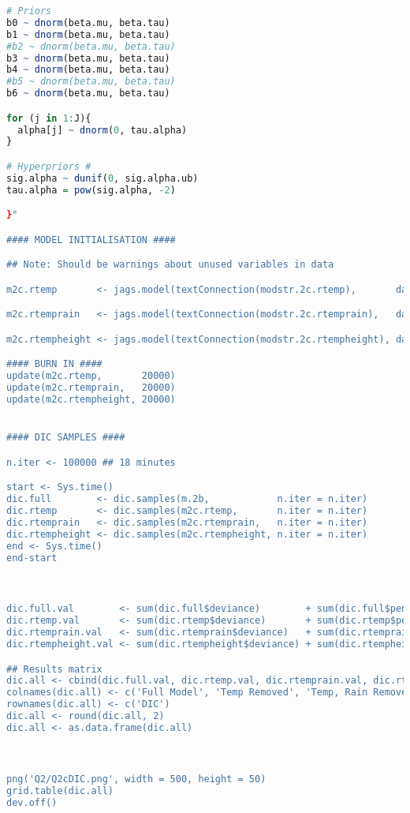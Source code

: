 \documentclass[11pt]{article}
\begin{document}
\begin{lstlisting}[language=R]
# Priors
b0 ~ dnorm(beta.mu, beta.tau)
b1 ~ dnorm(beta.mu, beta.tau)
#b2 ~ dnorm(beta.mu, beta.tau)
b3 ~ dnorm(beta.mu, beta.tau)
b4 ~ dnorm(beta.mu, beta.tau)
#b5 ~ dnorm(beta.mu, beta.tau)
b6 ~ dnorm(beta.mu, beta.tau)

for (j in 1:J){
  alpha[j] ~ dnorm(0, tau.alpha)
}

# Hyperpriors #
sig.alpha ~ dunif(0, sig.alpha.ub)
tau.alpha = pow(sig.alpha, -2)

}"

#### MODEL INITIALISATION ####

## Note: Should be warnings about unused variables in data

m2c.rtemp       <- jags.model(textConnection(modstr.2c.rtemp),       data = data, n.chains = 2)

m2c.rtemprain   <- jags.model(textConnection(modstr.2c.rtemprain),   data = data, n.chains = 2)

m2c.rtempheight <- jags.model(textConnection(modstr.2c.rtempheight), data = data, n.chains = 2)

#### BURN IN ####
update(m2c.rtemp,       20000)
update(m2c.rtemprain,   20000)
update(m2c.rtempheight, 20000)


#### DIC SAMPLES ####

n.iter <- 100000 ## 18 minutes

start <- Sys.time()
dic.full        <- dic.samples(m.2b,            n.iter = n.iter)
dic.rtemp       <- dic.samples(m2c.rtemp,       n.iter = n.iter)
dic.rtemprain   <- dic.samples(m2c.rtemprain,   n.iter = n.iter)
dic.rtempheight <- dic.samples(m2c.rtempheight, n.iter = n.iter)
end <- Sys.time()
end-start



dic.full.val        <- sum(dic.full$deviance)        + sum(dic.full$penalty)
dic.rtemp.val       <- sum(dic.rtemp$deviance)       + sum(dic.rtemp$penalty)
dic.rtemprain.val   <- sum(dic.rtemprain$deviance)   + sum(dic.rtemprain$penalty)
dic.rtempheight.val <- sum(dic.rtempheight$deviance) + sum(dic.rtempheight$penalty)

## Results matrix
dic.all <- cbind(dic.full.val, dic.rtemp.val, dic.rtemprain.val, dic.rtempheight.val)
colnames(dic.all) <- c('Full Model', 'Temp Removed', 'Temp, Rain Removed', 'Temp, Height Removed')
rownames(dic.all) <- c('DIC')
dic.all <- round(dic.all, 2)
dic.all <- as.data.frame(dic.all)



png('Q2/Q2cDIC.png', width = 500, height = 50)
grid.table(dic.all)
dev.off()


\end{lstlisting}
\end{document}
